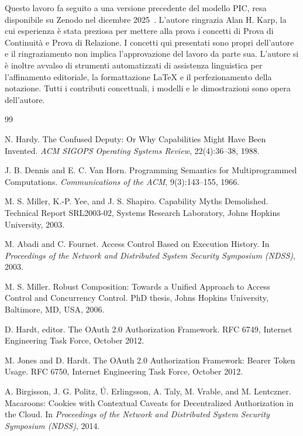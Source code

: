 \documentclass[11pt]{article}
\begin{document}
Questo lavoro fa seguito a una versione precedente del modello PIC, resa
disponibile su Zenodo nel dicembre 2025~\cite{gallo2025pic}. L'autore ringrazia
Alan H. Karp, la cui esperienza è stata preziosa per mettere alla prova i
concetti di Prova di Continuità e Prova di Relazione. I concetti qui presentati
sono propri dell'autore e il ringraziamento non implica l'approvazione del
lavoro da parte sua. L'autore si è inoltre avvalso di strumenti automatizzati di
assistenza linguistica per l'affinamento editoriale, la formattazione LaTeX e il
perfezionamento della notazione. Tutti i contributi concettuali, i modelli e le
dimostrazioni sono opera dell'autore.

\begin{thebibliography}{99}

N. Hardy.
\newblock The Confused Deputy: Or Why Capabilities Might Have Been Invented.
\newblock \emph{ACM SIGOPS Operating Systems Review}, 22(4):36--38, 1988.

J. B. Dennis and E. C. Van Horn.
\newblock Programming Semantics for Multiprogrammed Computations.
\newblock \emph{Communications of the ACM}, 9(3):143--155, 1966.

M. S. Miller, K.-P. Yee, and J. S. Shapiro.
\newblock Capability Myths Demolished.
\newblock Technical Report SRL2003-02, Systems Research Laboratory, Johns
Hopkins University, 2003.

M. Abadi and C. Fournet.
\newblock Access Control Based on Execution History.
\newblock In \emph{Proceedings of the Network and Distributed System Security
Symposium (NDSS)}, 2003.

M. S. Miller.
\newblock Robust Composition: Towards a Unified Approach to Access Control and
Concurrency Control.
\newblock PhD thesis, Johns Hopkins University, Baltimore, MD, USA, 2006.

D. Hardt, editor.
\newblock The OAuth 2.0 Authorization Framework.
\newblock RFC 6749, Internet Engineering Task Force, October 2012.

M. Jones and D. Hardt.
\newblock The OAuth 2.0 Authorization Framework: Bearer Token Usage.
\newblock RFC 6750, Internet Engineering Task Force, October 2012.

A. Birgisson, J. G. Politz, \'U. Erlingsson, A. Taly, M. Vrable, and
M. Lentczner.
\newblock Macaroons: Cookies with Contextual Caveats for Decentralized
Authorization in the Cloud.
\newblock In \emph{Proceedings of the Network and Distributed System Security
Symposium (NDSS)}, 2014.


\end{thebibliography}
\end{document}
